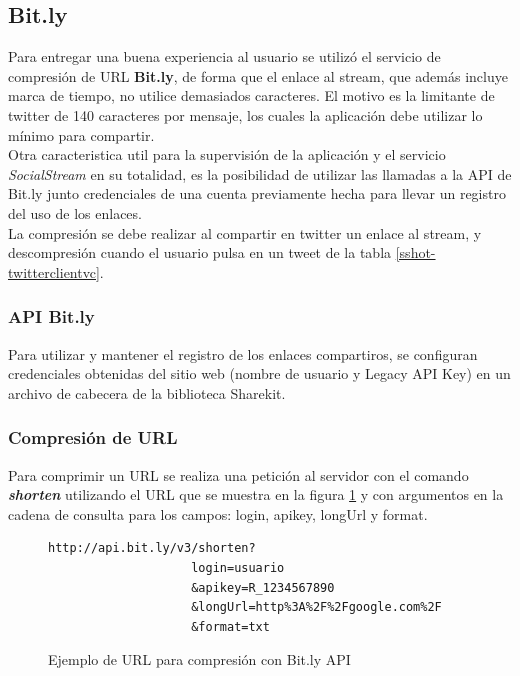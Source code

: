 	\subsection{Bit.ly}
Para entregar una buena experiencia al usuario se utilizó el servicio de compresión de URL \textbf{Bit.ly}, de forma que el enlace al stream, que además incluye marca de tiempo, no utilice demasiados caracteres. El motivo es la limitante de twitter de 140 caracteres por mensaje, los cuales la aplicación debe utilizar lo mínimo para compartir.\\

Otra caracteristica util para la supervisión de la aplicación y el servicio \textit{SocialStream} en su totalidad, es la posibilidad de utilizar las llamadas a la API de Bit.ly junto credenciales de una cuenta previamente hecha para llevar un registro del uso de los enlaces. \\

La compresión se debe realizar al compartir en twitter un enlace al stream, y descompresión cuando el usuario pulsa en un tweet de la tabla \ref{sshot-twitterclientvc}.

		\subsubsection{API Bit.ly}

Para utilizar y mantener el registro de los enlaces compartiros, se configuran credenciales obtenidas del sitio web \cite{bitly-settings} (nombre de usuario y Legacy API Key) en un archivo de cabecera de la biblioteca Sharekit.


		
		\subsubsection{Compresión de URL}
Para comprimir un URL se realiza una petición al servidor con el comando \textit{\textbf{shorten}} utilizando el URL que se muestra en la figura \ref{bitly-shorten} y con argumentos en la cadena de consulta para los campos: login, apikey, longUrl y format.

\begin{figure}[H]
	\centering
\begin{lstlisting}
http://api.bit.ly/v3/shorten?
					login=usuario
					&apikey=R_1234567890
					&longUrl=http%3A%2F%2Fgoogle.com%2F
					&format=txt
\end{lstlisting}
	\caption{Ejemplo de URL para compresión con Bit.ly API}
	\label{bitly-shorten}
\end{figure}	

